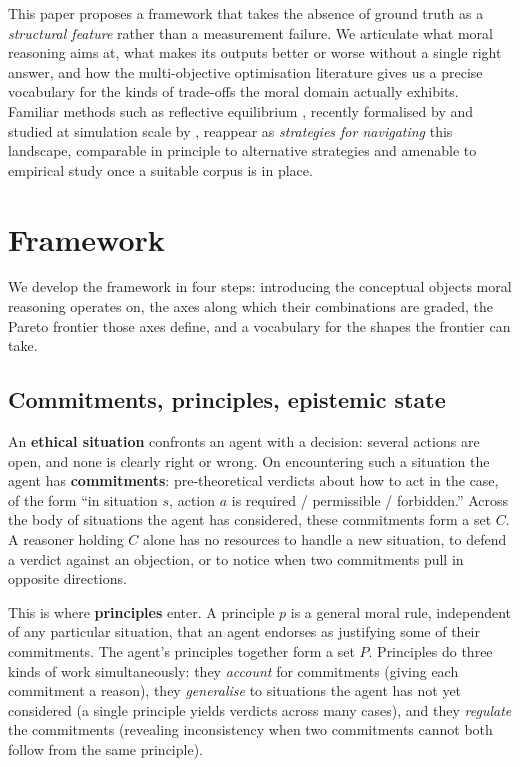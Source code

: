 \documentclass{article}
\begin{document}
This paper proposes a framework that takes the absence of ground truth as a
\emph{structural feature} rather than a measurement failure. We articulate
what moral reasoning aims at, what makes its outputs better or worse without
a single right answer, and how the multi-objective optimisation literature
\citep{deb2001multiobjective} gives us a precise vocabulary for the kinds of
trade-offs the moral domain actually exhibits. Familiar methods such as
reflective equilibrium \citep{rawls1971,knight2023}, recently formalised by
\citet{beisbart2021} and studied at simulation scale by \citet{freivogel2023},
reappear as \emph{strategies for navigating} this landscape, comparable in
principle to alternative strategies and amenable to empirical study once a
suitable corpus is in place.


\section{Framework}
\label{sec:framework}

We develop the framework in four steps: introducing the conceptual objects
moral reasoning operates on, the axes along which their combinations are
graded, the Pareto frontier those axes define, and a vocabulary for the
shapes the frontier can take.

\subsection{Commitments, principles, epistemic state}
\label{sec:concept}

An \textbf{ethical situation} confronts an agent with a decision: several
actions are open, and none is clearly right or wrong. On encountering such a
situation the agent has \textbf{commitments}: pre-theoretical verdicts about
how to act in the case, of the form ``in situation $s$, action $a$ is
required / permissible / forbidden.'' Across the body of situations the
agent has considered, these commitments form a set $C$. A reasoner holding
$C$ alone has no resources to handle a new situation, to defend a verdict
against an objection, or to notice when two commitments pull in opposite
directions.

This is where \textbf{principles} enter. A principle $p$ is a general moral
rule, independent of any particular situation, that an agent endorses as
justifying some of their commitments. The agent's principles together form
a set $P$. Principles do three kinds of work simultaneously: they
\emph{account} for commitments (giving each commitment a reason), they
\emph{generalise} to situations the agent has not yet considered (a single
principle yields verdicts across many cases), and they \emph{regulate} the
commitments (revealing inconsistency when two commitments cannot both
follow from the same principle).
\end{document}
